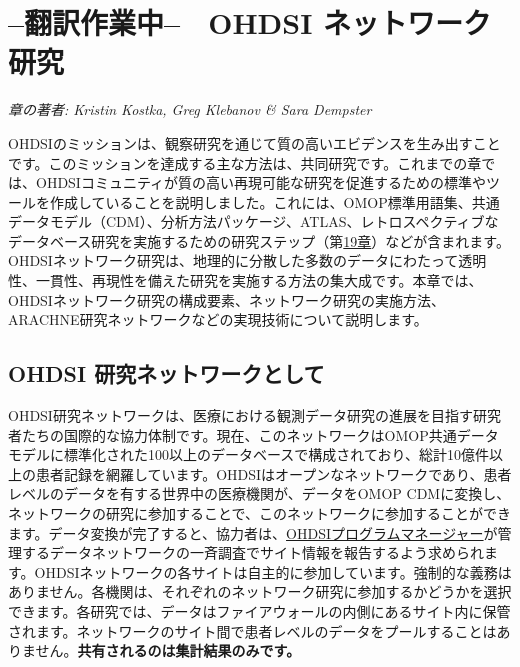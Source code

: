 \documentclass[
  11pt]{book}
\theoremstyle{definition}
\theoremstyle{definition}
\theoremstyle{definition}
\theoremstyle{definition}
\theoremstyle{remark}
\begin{document}
\chapter{--翻訳作業中--　OHDSI ネットワーク研究}\label{NetworkResearch}

\emph{章の著者: Kristin Kostka, Greg Klebanov \& Sara Dempster}

OHDSIのミッションは、観察研究を通じて質の高いエビデンスを生み出すことです。このミッションを達成する主な方法は、共同研究です。これまでの章では、OHDSIコミュニティが質の高い再現可能な研究を促進するための標準やツールを作成していることを説明しました。これには、OMOP標準用語集、共通データモデル（CDM）、分析方法パッケージ、ATLAS、レトロスペクティブなデータベース研究を実施するための研究ステップ（第\href{https://ohdsi.github.io/TheBookOfOhdsi/StudySteps.html\#StudySteps}{19章}）などが含まれます。OHDSIネットワーク研究は、地理的に分散した多数のデータにわたって透明性、一貫性、再現性を備えた研究を実施する方法の集大成です。本章では、OHDSIネットワーク研究の構成要素、ネットワーク研究の実施方法、ARACHNE研究ネットワークなどの実現技術について説明します。

\section{OHDSI 研究ネットワークとして}\label{ohdsi-ux7814ux7a76ux30cdux30c3ux30c8ux30efux30fcux30afux3068ux3057ux3066}


OHDSI研究ネットワークは、医療における観測データ研究の進展を目指す研究者たちの国際的な協力体制です。現在、このネットワークはOMOP共通データモデルに標準化された100以上のデータベースで構成されており、総計10億件以上の患者記録を網羅しています。OHDSIはオープンなネットワークであり、患者レベルのデータを有する世界中の医療機関が、データをOMOP CDMに変換し、ネットワークの研究に参加することで、このネットワークに参加することができます。データ変換が完了すると、協力者は、\href{mailto:contact@ohdsi.org}{OHDSIプログラムマネージャー}が管理するデータネットワークの一斉調査でサイト情報を報告するよう求められます。OHDSIネットワークの各サイトは自主的に参加しています。強制的な義務はありません。各機関は、それぞれのネットワーク研究に参加するかどうかを選択できます。各研究では、データはファイアウォールの内側にあるサイト内に保管されます。ネットワークのサイト間で患者レベルのデータをプールすることはありません。\textbf{共有されるのは集計結果のみです。}
\end{document}
